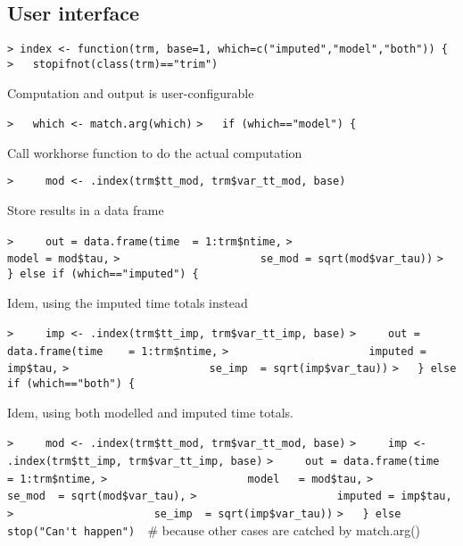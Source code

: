 \documentclass[a4paper]{article}
\begin{document}
\subsection{User interface}\par

\verb~> index <- function(trm, base=1, which=c("imputed","model","both")) {~\newline
\verb~>   stopifnot(class(trm)=="trim")~\par

Computation and output is user-configurable\par
\verb~>   which <- match.arg(which)~\newline
\verb~>   if (which=="model") {~\par
Call workhorse function to do the actual computation\par
\verb~>     mod <- .index(trm$tt_mod, trm$var_tt_mod, base)~\par
Store results in a data frame\par
\verb~>     out = data.frame(time  = 1:trm$ntime,~\newline
\verb~>                      model = mod$tau,~\newline
\verb~>                      se_mod = sqrt(mod$var_tau))~\newline
\verb~>   } else if (which=="imputed") {~\par
Idem, using the imputed time totals instead\par
\verb~>     imp <- .index(trm$tt_imp, trm$var_tt_imp, base)~\newline
\verb~>     out = data.frame(time    = 1:trm$ntime,~\newline
\verb~>                      imputed = imp$tau,~\newline
\verb~>                      se_imp  = sqrt(imp$var_tau))~\newline
\verb~>   } else if (which=="both") {~\par
Idem, using both modelled and imputed time totals.\par
\verb~>     mod <- .index(trm$tt_mod, trm$var_tt_mod, base)~\newline
\verb~>     imp <- .index(trm$tt_imp, trm$var_tt_imp, base)~\newline
\verb~>     out = data.frame(time    = 1:trm$ntime,~\newline
\verb~>                      model   = mod$tau,~\newline
\verb~>                      se_mod  = sqrt(mod$var_tau),~\newline
\verb~>                      imputed = imp$tau,~\newline
\verb~>                      se_imp  = sqrt(imp$var_tau))~\newline
\verb~>   } else stop("Can't happen")  ~{\sffamily\# because other cases are catched by match.arg()}\par
\end{document}
